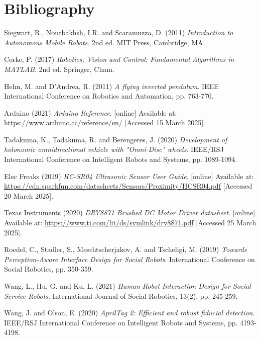 \section{Bibliography}

\begin{thebibliography}{99}

Siegwart, R., Nourbakhsh, I.R. and Scaramuzza, D. (2011)
\textit{Introduction to Autonomous Mobile Robots}.
2nd ed. MIT Press, Cambridge, MA.

Corke, P. (2017)
\textit{Robotics, Vision and Control: Fundamental Algorithms in MATLAB}.
2nd ed. Springer, Cham.

Hehn, M. and D'Andrea, R. (2011)
\textit{A flying inverted pendulum}.
IEEE International Conference on Robotics and Automation, pp. 763-770.

Arduino (2021)
\textit{Arduino Reference}.
[online] Available at: \url{https://www.arduino.cc/reference/en/} [Accessed 15 March 2025].

Tadakuma, K., Tadakuma, R. and Berengeres, J. (2020)
\textit{Development of holonomic omnidirectional vehicle with "Omni-Disc" wheels}.
IEEE/RSJ International Conference on Intelligent Robots and Systems, pp. 1089-1094.

Elec Freaks (2019)
\textit{HC-SR04 Ultrasonic Sensor User Guide}.
[online] Available at: \url{https://cdn.sparkfun.com/datasheets/Sensors/Proximity/HCSR04.pdf} [Accessed 20 March 2025].

Texas Instruments (2020)
\textit{DRV8871 Brushed DC Motor Driver datasheet}.
[online] Available at: \url{https://www.ti.com/lit/ds/symlink/drv8871.pdf} [Accessed 25 March 2025].

Roedel, C., Stadler, S., Meschtscherjakov, A. and Tscheligi, M. (2019)
\textit{Towards Perception-Aware Interface Design for Social Robots}.
International Conference on Social Robotics, pp. 350-359.

Wang, L., Hu, G. and Ku, L. (2021)
\textit{Human-Robot Interaction Design for Social Service Robots}.
International Journal of Social Robotics, 13(2), pp. 245-259.

Wang, J. and Olson, E. (2020)
\textit{AprilTag 2: Efficient and robust fiducial detection}.
IEEE/RSJ International Conference on Intelligent Robots and Systems, pp. 4193-4198.

\end{thebibliography}
